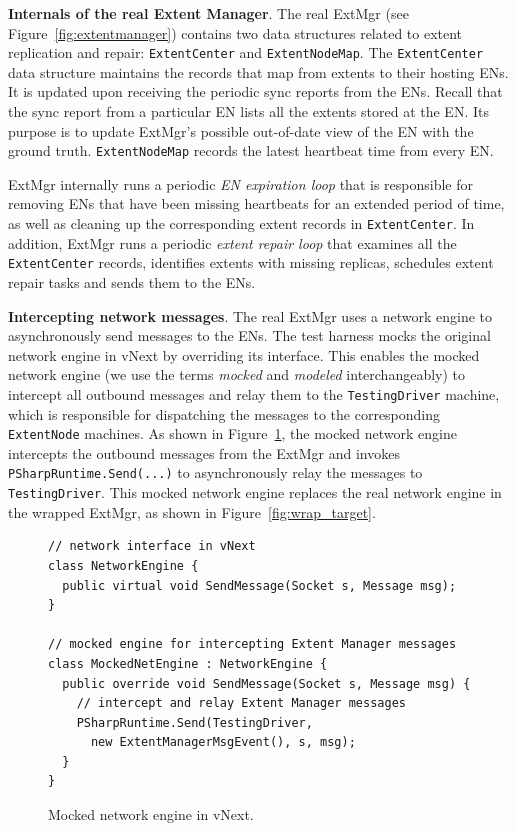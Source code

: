 \textbf{Internals of the real Extent Manager}.
The real ExtMgr (see Figure~\ref{fig:extentmanager}) contains two data structures related to extent replication and repair: \texttt{ExtentCenter} and \texttt{ExtentNodeMap}. The \texttt{ExtentCenter} data structure maintains the records that map from extents to their hosting ENs. It is updated upon receiving the periodic sync reports from the ENs. Recall that the sync report from a particular EN lists all the extents stored at the EN. Its purpose is to update ExtMgr's possible out-of-date view of the EN with the ground truth. \texttt{ExtentNodeMap} records the latest heartbeat time from every EN.

ExtMgr internally runs a periodic \emph{EN expiration loop} that is responsible for removing ENs that have been missing heartbeats for an extended period of time, as well as cleaning up the corresponding extent records in \texttt{ExtentCenter}. In addition, ExtMgr runs a periodic \emph{extent repair loop} that examines all the \texttt{ExtentCenter} records, identifies extents with missing replicas, schedules extent repair tasks and sends them to the ENs.

\textbf{Intercepting network messages}.
The real ExtMgr uses a network engine to asynchronously send messages to the ENs. The \psharp test harness mocks the original network engine in vNext by overriding its interface. This enables the mocked network engine (we use the terms \textit{mocked} and \textit{modeled} interchangeably) to intercept all outbound messages and relay them to the \texttt{TestingDriver} machine, which is responsible for dispatching the messages to the corresponding \texttt{ExtentNode} machines. As shown in Figure~\ref{fig:enginecode}, the mocked network engine intercepts the outbound messages from the ExtMgr and invokes \texttt{PSharpRuntime.Send(...)} to asynchronously relay the messages to \texttt{TestingDriver}. This mocked network engine replaces the real network engine in the wrapped ExtMgr, as shown in Figure~\ref{fig:wrap_target}.

\begin{figure}[t]
\begin{lstlisting}
// network interface in vNext
class NetworkEngine {
  public virtual void SendMessage(Socket s, Message msg);
}

// mocked engine for intercepting Extent Manager messages
class MockedNetEngine : NetworkEngine {
  public override void SendMessage(Socket s, Message msg) {
    // intercept and relay Extent Manager messages
    PSharpRuntime.Send(TestingDriver,
      new ExtentManagerMsgEvent(), s, msg);
  }
}
\end{lstlisting}
\vspace{-4mm}
\caption{Mocked network engine in vNext.}
\label{fig:enginecode}
\vspace{-2mm}
\end{figure}

